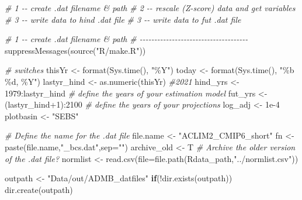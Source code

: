 \documentclass[
]{article}
\newenvironment{Shaded}{\begin{snugshade}}{\end{snugshade}}
\newcommand{\AttributeTok}[1]{\textcolor[rgb]{0.77,0.63,0.00}{#1}}
\newcommand{\CommentTok}[1]{\textcolor[rgb]{0.56,0.35,0.01}{\textit{#1}}}
\newcommand{\ControlFlowTok}[1]{\textcolor[rgb]{0.13,0.29,0.53}{\textbf{#1}}}
\newcommand{\DecValTok}[1]{\textcolor[rgb]{0.00,0.00,0.81}{#1}}
\newcommand{\FloatTok}[1]{\textcolor[rgb]{0.00,0.00,0.81}{#1}}
\newcommand{\FunctionTok}[1]{\textcolor[rgb]{0.00,0.00,0.00}{#1}}
\newcommand{\NormalTok}[1]{#1}
\newcommand{\OtherTok}[1]{\textcolor[rgb]{0.56,0.35,0.01}{#1}}
\newcommand{\SpecialCharTok}[1]{\textcolor[rgb]{0.00,0.00,0.00}{#1}}
\newcommand{\StringTok}[1]{\textcolor[rgb]{0.31,0.60,0.02}{#1}}
\begin{document}
\begin{Shaded}
\begin{Highlighting}[]
  \CommentTok{\# 1 {-}{-} create .dat filename \& path}
  \CommentTok{\# 2 {-}{-} rescale (Z{-}score) data and get variables}
  \CommentTok{\# 3 {-}{-} write data to hind .dat file}
  \CommentTok{\# 3 {-}{-} write data to fut  .dat file}
  
  \CommentTok{\# 1 {-}{-} create .dat filename \& path}
  \CommentTok{\# {-}{-}{-}{-}{-}{-}{-}{-}{-}{-}{-}{-}{-}{-}{-}{-}{-}{-}{-}{-}{-}{-}{-}{-}{-}{-}{-}{-}{-}{-}{-}{-}{-}{-}{-}{-}{-}}
  \FunctionTok{suppressMessages}\NormalTok{(}\FunctionTok{source}\NormalTok{(}\StringTok{"R/make.R"}\NormalTok{))}

  
  \CommentTok{\# switches }
\NormalTok{    thisYr }\OtherTok{\textless{}{-}} \FunctionTok{format}\NormalTok{(}\FunctionTok{Sys.time}\NormalTok{(), }\StringTok{"\%Y"}\NormalTok{)}
\NormalTok{    today  }\OtherTok{\textless{}{-}} \FunctionTok{format}\NormalTok{(}\FunctionTok{Sys.time}\NormalTok{(), }\StringTok{"\%b \%d, \%Y"}\NormalTok{)}
\NormalTok{    lastyr\_hind }\OtherTok{\textless{}{-}} \FunctionTok{as.numeric}\NormalTok{(thisYr)  }\CommentTok{\#2021}
\NormalTok{    hind\_yrs    }\OtherTok{\textless{}{-}} \DecValTok{1979}\SpecialCharTok{:}\NormalTok{lastyr\_hind   }\CommentTok{\# define the years of your estimation model}
\NormalTok{    fut\_yrs     }\OtherTok{\textless{}{-}}\NormalTok{ (lastyr\_hind}\SpecialCharTok{+}\DecValTok{1}\NormalTok{)}\SpecialCharTok{:}\DecValTok{2100}   \CommentTok{\# define the years of your projections}
\NormalTok{    log\_adj     }\OtherTok{\textless{}{-}} \FloatTok{1e{-}4}
\NormalTok{    plotbasin   }\OtherTok{\textless{}{-}} \StringTok{"SEBS"}  
  
  \CommentTok{\# Define the name for the .dat file}
\NormalTok{    file.name   }\OtherTok{\textless{}{-}} \StringTok{"ACLIM2\_CMIP6\_short"}
\NormalTok{    fn          }\OtherTok{\textless{}{-}} \FunctionTok{paste}\NormalTok{(file.name,}\StringTok{"\_bcs.dat"}\NormalTok{,}\AttributeTok{sep=}\StringTok{""}\NormalTok{)}
\NormalTok{    archive\_old }\OtherTok{\textless{}{-}}\NormalTok{ T  }\CommentTok{\# Archive the older version of the .dat file?}
\NormalTok{    normlist    }\OtherTok{\textless{}{-}} \FunctionTok{read.csv}\NormalTok{(}\AttributeTok{file=}\FunctionTok{file.path}\NormalTok{(Rdata\_path,}\StringTok{"../normlist.csv"}\NormalTok{))}
    
\NormalTok{    outpath     }\OtherTok{\textless{}{-}} \StringTok{"Data/out/ADMB\_datfiles"}
    \ControlFlowTok{if}\NormalTok{(}\SpecialCharTok{!}\FunctionTok{dir.exists}\NormalTok{(outpath)) }\FunctionTok{dir.create}\NormalTok{(outpath)}
    

\end{Highlighting}
\end{Shaded}
\end{document}
